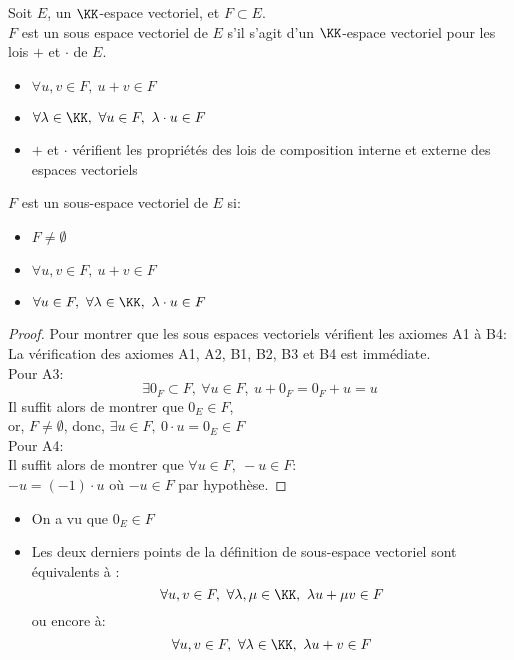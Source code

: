 \documentclass[../main.tex]{subfile}
\begin{document}
\begin{defi}
	Soit $E$, un $\KK$-espace vectoriel, et $F \subset E$.\\
	$F$ est un sous espace vectoriel de $E$ s'il s'agit d'un $\KK$-espace vectoriel pour les lois $+$ et $\cdot$ de $E$.
\begin{itemize}
	\item $\forall u, v \in F, \ u + v \in F$
	\item $\forall \lambda \in \KK, \ \forall u \in F, \ \lambda \cdot u \in F$
	\item $+$ et $\cdot$ vérifient les propriétés des lois de composition interne et externe des espaces vectoriels
\end{itemize}
\end{defi}

\begin{propri}
	$F$ est un sous-espace vectoriel de $E$ si:
\begin{itemize}
	\item $F \neq \emptyset$
	\item $\forall u, v \in F, \ u+v \in F$
	\item $\forall u \in F, \ \forall \lambda \in \KK, \ \lambda \cdot u \in F$
\end{itemize}
\end{propri}

\begin{proof}
	Pour montrer que les sous espaces vectoriels vérifient les axiomes A1 à B4:\\
	La vérification des axiomes A1, A2, B1, B2, B3 et B4 est immédiate.\\
	Pour A3:\\
	$$\exists 0_F \subset F, \ \forall u \in F, \ u+0_F = 0_F + u = u$$
	Il suffit alors de montrer que $0_E \in F$, \\
	or, $F \neq \emptyset$, donc, $\exists u \in F, \ 0 \cdot u = 0_E \in F$\\

	Pour A4:\\
	Il suffit alors de montrer que $\forall u \in F, \ -u \in F$:\\
	$-u = (-1) \cdot u$ où $-u \in F$ par hypothèse.
\end{proof}

\begin{rema}
\begin{itemize}	
	\item On a vu que $0_E \in F$
	\item Les deux derniers points de la définition de sous-espace vectoriel sont équivalents à :
	$$\forall u, v \in F, \ \forall \lambda, \mu \in \KK, \ \lambda u + \mu v \in F$$
	ou encore à:
	$$\forall u, v \in F, \ \forall \lambda \in \KK, \ \lambda u + v \in F$$
\end{itemize}
\end{rema}
\end{document}
